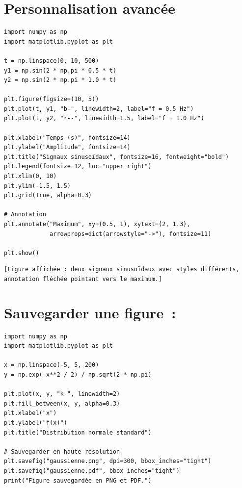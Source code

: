 \section{Personnalisation avanc\'ee}

\begin{codeblock}[title=\textbf{Python}]
\begin{verbatim}
import numpy as np
import matplotlib.pyplot as plt

t = np.linspace(0, 10, 500)
y1 = np.sin(2 * np.pi * 0.5 * t)
y2 = np.sin(2 * np.pi * 1.0 * t)

plt.figure(figsize=(10, 5))
plt.plot(t, y1, "b-", linewidth=2, label="f = 0.5 Hz")
plt.plot(t, y2, "r--", linewidth=1.5, label="f = 1.0 Hz")

plt.xlabel("Temps (s)", fontsize=14)
plt.ylabel("Amplitude", fontsize=14)
plt.title("Signaux sinusoïdaux", fontsize=16, fontweight="bold")
plt.legend(fontsize=12, loc="upper right")
plt.xlim(0, 10)
plt.ylim(-1.5, 1.5)
plt.grid(True, alpha=0.3)

# Annotation
plt.annotate("Maximum", xy=(0.5, 1), xytext=(2, 1.3),
             arrowprops=dict(arrowstyle="->"), fontsize=11)

plt.show()
\end{verbatim}
\end{codeblock}

\begin{codeoutput}
\begin{verbatim}
[Figure affichée : deux signaux sinusoïdaux avec styles différents,
annotation fléchée pointant vers le maximum.]
\end{verbatim}
\end{codeoutput}

\section{Sauvegarder une figure~: }

\begin{codeblock}[title=\textbf{Python}]
\begin{verbatim}
import numpy as np
import matplotlib.pyplot as plt

x = np.linspace(-5, 5, 200)
y = np.exp(-x**2 / 2) / np.sqrt(2 * np.pi)

plt.plot(x, y, "k-", linewidth=2)
plt.fill_between(x, y, alpha=0.3)
plt.xlabel("x")
plt.ylabel("f(x)")
plt.title("Distribution normale standard")

# Sauvegarder en haute résolution
plt.savefig("gaussienne.png", dpi=300, bbox_inches="tight")
plt.savefig("gaussienne.pdf", bbox_inches="tight")
print("Figure sauvegardée en PNG et PDF.")
\end{verbatim}
\end{codeblock}

